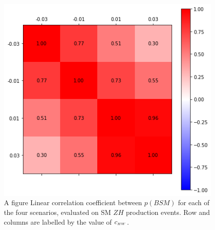 \begin{figure}[h!]
\includegraphics[width=0.35\linewidth]{plots/bdt_corr.png}
\caption{\label{fig:bdt_corr}A figure
  Linear correlation coefficient between $p(BSM)$ for
  each of the four scenarios, evaluated on SM $Z H$ production events.
  Row and columns are labelled by the value of $c_{\scriptscriptstyle HW}$.
}
\end{figure}


